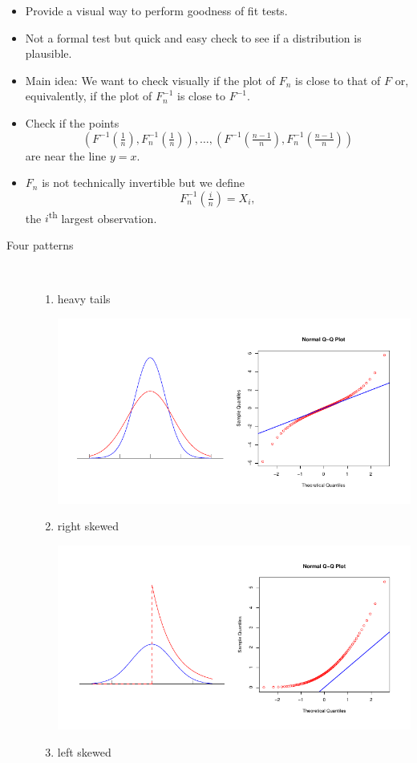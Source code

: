 \documentclass[a4paper, 10pt,landscape]{article}
\begin{document}
\begin{multicols*}{3}
\begin{itemize}
	\item Provide a visual way to perform goodness of fit tests.
	\item Not a formal test but quick and easy check to see if a distribution is plausible.
	\item Main idea: We want to check visually if the plot of $F_n$ is close to that of $F$ or, equivalently, if the plot of $F_n^{-1}$ is close to $F^{-1}$.
	\item Check if the points
	$$\left(F^{-1}(\tfrac{1}{n}),F_n^{-1}(\tfrac{1}{n})\right),\dots,\left(F^{-1}(\tfrac{n-1}{n}),F_n^{-1}(\tfrac{n-1}{n})\right)$$
	are near the line $y=x.$
	\item $F_n$ is not technically invertible but we define
	$$F_n^{-1}(\tfrac{i}{n})=X_i,$$
	the $i$\textsuperscript{th} largest observation.
\end{itemize}
\begin{description}
	\item[Four patterns] ~
	\begin{enumerate}
		\item heavy tails
		\begin{center}
		\includegraphics[width=0.65\columnwidth,trim={2cm 0 0 1cm}]{1.pdf}
		\end{center}
		\item right skewed
\begin{center}
	\includegraphics[width=0.65\columnwidth,trim={2cm 0 0 1cm}]{2.pdf}
\end{center}
		\item left skewed
\begin{center}

\end{center}
\end{enumerate}
\end{description}
\end{multicols*}
\end{document}
